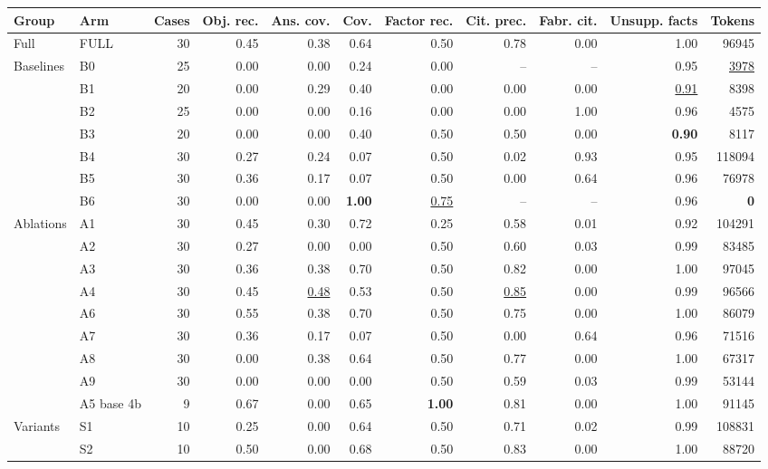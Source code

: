 \begin{table}[t]
\centering\footnotesize
\begin{adjustbox}{max width=\textwidth}
\begin{tabular}{@{}llrrrrrrrrr@{}}
\toprule
Group & Arm & Cases & Obj. rec. & Ans. cov. & Cov. & Factor rec. & Cit. prec. & Fabr. cit. & Unsupp. facts & Tokens \\
\midrule
Full & FULL & 30 & 0.45 & 0.38 & 0.64 & 0.50 & 0.78 & 0.00 & 1.00 & 96945 \\
\midrule
Baselines & B0 & 25 & 0.00 & 0.00 & 0.24 & 0.00 & -- & -- & 0.95 & \underline{3978} \\
 & B1 & 20 & 0.00 & 0.29 & 0.40 & 0.00 & 0.00 & 0.00 & \underline{0.91} & 8398 \\
 & B2 & 25 & 0.00 & 0.00 & 0.16 & 0.00 & 0.00 & 1.00 & 0.96 & 4575 \\
 & B3 & 20 & 0.00 & 0.00 & 0.40 & 0.50 & 0.50 & 0.00 & \textbf{0.90} & 8117 \\
 & B4 & 30 & 0.27 & 0.24 & 0.07 & 0.50 & 0.02 & 0.93 & 0.95 & 118094 \\
 & B5 & 30 & 0.36 & 0.17 & 0.07 & 0.50 & 0.00 & 0.64 & 0.96 & 76978 \\
 & B6 & 30 & 0.00 & 0.00 & \textbf{1.00} & \underline{0.75} & -- & -- & 0.96 & \textbf{0} \\
\midrule
Ablations & A1 & 30 & 0.45 & 0.30 & 0.72 & 0.25 & 0.58 & 0.01 & 0.92 & 104291 \\
 & A2 & 30 & 0.27 & 0.00 & 0.00 & 0.50 & 0.60 & 0.03 & 0.99 & 83485 \\
 & A3 & 30 & 0.36 & 0.38 & 0.70 & 0.50 & 0.82 & 0.00 & 1.00 & 97045 \\
 & A4 & 30 & 0.45 & \underline{0.48} & 0.53 & 0.50 & \underline{0.85} & 0.00 & 0.99 & 96566 \\
 & A6 & 30 & 0.55 & 0.38 & 0.70 & 0.50 & 0.75 & 0.00 & 1.00 & 86079 \\
 & A7 & 30 & 0.36 & 0.17 & 0.07 & 0.50 & 0.00 & 0.64 & 0.96 & 71516 \\
 & A8 & 30 & 0.00 & 0.38 & 0.64 & 0.50 & 0.77 & 0.00 & 1.00 & 67317 \\
 & A9 & 30 & 0.00 & 0.00 & 0.00 & 0.50 & 0.59 & 0.03 & 0.99 & 53144 \\
 & A5 base 4b & 9 & 0.67 & 0.00 & 0.65 & \textbf{1.00} & 0.81 & 0.00 & 1.00 & 91145 \\
\midrule
Variants & S1 & 10 & 0.25 & 0.00 & 0.64 & 0.50 & 0.71 & 0.02 & 0.99 & 108831 \\
 & S2 & 10 & 0.50 & 0.00 & 0.68 & 0.50 & 0.83 & 0.00 & 1.00 & 88720 \\

\end{tabular}
\end{adjustbox}
\end{table}
